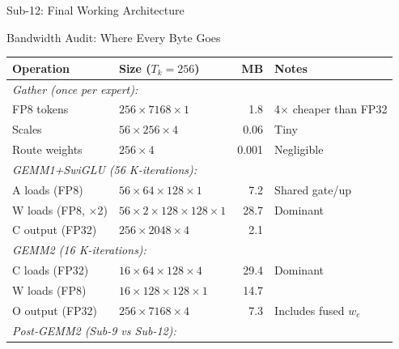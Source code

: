 \documentclass[aspectratio=169,11pt]{beamer}
\begin{document}
\begin{frame}{Sub-12: Final Working Architecture}
\begin{center}
\end{center}
\end{frame}

\begin{frame}[t]{Bandwidth Audit: Where Every Byte Goes}
\begin{center}
\scriptsize
\begin{tabular}{llrl}
\toprule
\textbf{Operation} & \textbf{Size ($T_k{=}256$)} & \textbf{MB} & \textbf{Notes} \\
\midrule
\multicolumn{4}{l}{\textit{Gather (once per expert):}} \\
\quad FP8 tokens & $256 \times 7168 \times 1$ & 1.8 & 4$\times$ cheaper than FP32 \\
\quad Scales & $56 \times 256 \times 4$ & 0.06 & Tiny \\
\quad Route weights & $256 \times 4$ & 0.001 & Negligible \\
\midrule
\multicolumn{4}{l}{\textit{GEMM1+SwiGLU (56 K-iterations):}} \\
\quad A loads (FP8) & $56 \times 64 \times 128 \times 1$ & 7.2 & Shared gate/up \\
\quad W loads (FP8, $\times$2) & $56 \times 2 \times 128 \times 128 \times 1$ & 28.7 & 
    \textcolor{deepred}{Dominant} \\
\quad C output (FP32) & $256 \times 2048 \times 4$ & 2.1 & \\
\midrule
\multicolumn{4}{l}{\textit{GEMM2 (16 K-iterations):}} \\
\quad C loads (FP32) & $16 \times 64 \times 128 \times 4$ & 29.4 & 
    \textcolor{deepred}{Dominant} \\
\quad W loads (FP8) & $16 \times 128 \times 128 \times 1$ & 14.7 & \\
\quad O output (FP32) & $256 \times 7168 \times 4$ & 7.3 & 
    Includes fused $w_e$ \\
\midrule
\multicolumn{4}{l}{\textit{Post-GEMM2 (Sub-9 vs Sub-12):}} \\

\end{tabular}
\end{center}
\end{frame}
\end{document}
